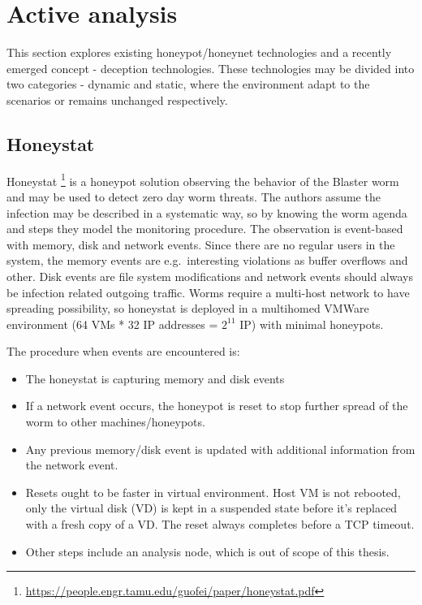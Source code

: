 \section{Active analysis \label{related:active-anal}}
This section explores existing honeypot/honeynet technologies and a recently emerged concept - deception technologies. These technologies may be divided into two categories - dynamic \cite{blog:dynamic-honeypot} and static, where the environment adapt to the scenarios or remains unchanged respectively.

\subsection{Honeystat \label{related:active-anal:honeystat}}
Honeystat \footnote{\url{https://people.engr.tamu.edu/guofei/paper/honeystat.pdf}} is a honeypot solution observing the behavior of the Blaster worm and may be used to detect zero day worm threats. The authors assume the infection may be described in a systematic way, so by knowing the worm agenda and steps they model the monitoring procedure. The observation is event-based with memory, disk and network events. Since there are no regular users in the system, the memory events are e.g.~interesting violations as buffer overflows and other. Disk events are file system modifications and network events should always be infection related outgoing traffic. Worms require a multi-host network to have spreading possibility, so honeystat is deployed in a multihomed VMWare environment (64 VMs * 32 IP addresses = $2^{11}$ IP) with minimal honeypots.

The procedure when events are encountered is:

\begin{itemize}[noitemsep]
	\item
	The honeystat is capturing memory and disk events
	\item
	If a network event occurs, the honeypot is reset to stop further spread of the worm to other machines/honeypots.
	\item
	Any previous memory/disk event is updated with additional information from the network event.
	\item
	Resets ought to be faster in virtual environment. Host VM is not rebooted, only the virtual disk (VD) is kept in a suspended state before it's replaced with a fresh copy of a VD. The reset always completes before a TCP timeout.
	\item
	Other steps include an analysis node, which is out of scope of this thesis.
\end{itemize}

